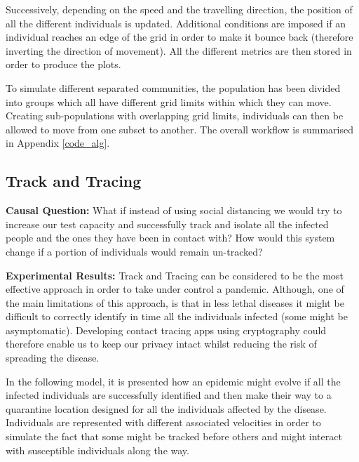 Successively, depending on the speed and the travelling direction, the position of all the different individuals is updated. Additional conditions are imposed if an individual reaches an edge of the grid in order to make it bounce back (therefore inverting the direction of movement). All the different metrics are then stored in order to produce the plots.

To simulate different separated communities, the population has been divided into groups which all have different grid limits within which they can move. Creating sub-populations with overlapping grid limits, individuals can then be allowed to move from one subset to another. The overall workflow is summarised in Appendix \ref{code_alg}.

\subsection{Track and Tracing}

\textbf{Causal Question:} What if instead of using social distancing we would try to increase our test capacity and successfully track and isolate all the infected people and the ones they have been in contact with? How would this system change if a portion of individuals would remain un-tracked?

\textbf{Experimental Results:} Track and Tracing can be considered to be the most effective approach in order to take under control a pandemic. Although, one of the main limitations of this approach, is that in less lethal diseases it might be difficult to correctly identify in time all the individuals infected (some might be asymptomatic). Developing contact tracing apps using cryptography could therefore enable us to keep our privacy intact whilst reducing the risk of spreading the disease.

In the following model, it is presented how an epidemic might evolve if all the infected individuals are successfully identified and then make their way to a quarantine location designed for all the individuals affected by the disease. Individuals are represented with different associated velocities in order to simulate the fact that some might be tracked before others and might interact with susceptible individuals along the way.

